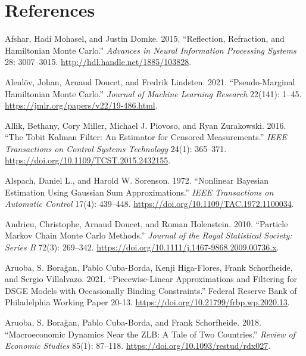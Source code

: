 \documentclass[11pt]{article}
\begin{document}
\section*{References}
\begin{list}{}{\setlength{\leftmargin}{2em}\setlength{\itemindent}{-2em}\setlength{\itemsep}{2pt}\setlength{\parsep}{0pt}}

\item Afshar, Hadi Mohasel, and Justin Domke. 2015. ``Reflection, Refraction, and Hamiltonian Monte Carlo.'' \emph{Advances in Neural Information Processing Systems} 28: 3007--3015. \url{http://hdl.handle.net/1885/103828}.

\item Alenl\"ov, Johan, Arnaud Doucet, and Fredrik Lindsten. 2021. ``Pseudo-Marginal Hamiltonian Monte Carlo.'' \emph{Journal of Machine Learning Research} 22(141): 1--45. \url{https://jmlr.org/papers/v22/19-486.html}.

\item Allik, Bethany, Cory Miller, Michael J. Piovoso, and Ryan Zurakowski. 2016. ``The Tobit Kalman Filter: An Estimator for Censored Measurements.'' \emph{IEEE Transactions on Control Systems Technology} 24(1): 365--371. \url{https://doi.org/10.1109/TCST.2015.2432155}.

\item Alspach, Daniel L., and Harold W. Sorenson. 1972. ``Nonlinear Bayesian Estimation Using Gaussian Sum Approximations.'' \emph{IEEE Transactions on Automatic Control} 17(4): 439--448. \url{https://doi.org/10.1109/TAC.1972.1100034}.

\item Andrieu, Christophe, Arnaud Doucet, and Roman Holenstein. 2010. ``Particle Markov Chain Monte Carlo Methods.'' \emph{Journal of the Royal Statistical Society: Series B} 72(3): 269--342. \url{https://doi.org/10.1111/j.1467-9868.2009.00736.x}.

\item Aruoba, S. Bora\u{g}an, Pablo Cuba-Borda, Kenji Higa-Flores, Frank Schorfheide, and Sergio Villalvazo. 2021. ``Piecewise-Linear Approximations and Filtering for DSGE Models with Occasionally Binding Constraints.'' Federal Reserve Bank of Philadelphia Working Paper 20-13. \url{https://doi.org/10.21799/frbp.wp.2020.13}.

\item Aruoba, S. Bora\u{g}an, Pablo Cuba-Borda, and Frank Schorfheide. 2018. ``Macroeconomic Dynamics Near the ZLB: A Tale of Two Countries.'' \emph{Review of Economic Studies} 85(1): 87--118. \url{https://doi.org/10.1093/restud/rdx027}.


\end{list}
\end{document}
